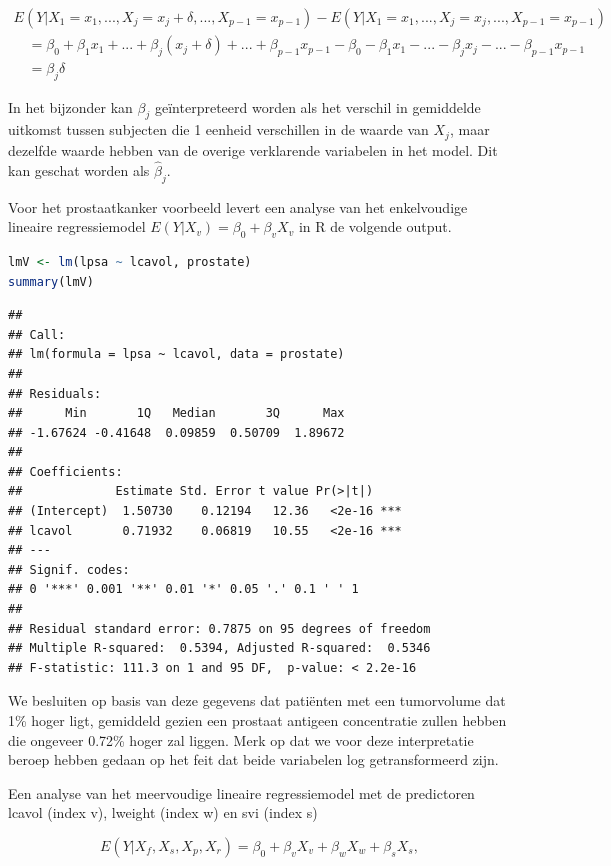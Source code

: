 \documentclass[
  12pt,dutch,coursenotes]{book}
\begin{document}
\[
\begin{array}{l}
E(Y|X_1=x_1,...,X_j=x_j+\delta,...,X_{p-1}=x_{p-1}) - E(Y|X_1=x_1,...,X_j=x_j,...,X_{p-1}=x_{p-1}) \\
\quad =\beta_0 + \beta_1 x_1 + ... + \beta_j(x_j+\delta)+...+\beta_{p-1} x_{p-1} - \beta_0 - \beta_1 x_1 - ... - \beta_jx_j-...-\beta_{p-1} x_{p-1} \\
\quad= \beta_j\delta
\end{array}
\]

In het bijzonder kan \(\beta_j\) geïnterpreteerd worden als het verschil in gemiddelde uitkomst tussen subjecten die 1 eenheid verschillen in de
waarde van \(X_j\), maar dezelfde waarde hebben van de overige verklarende variabelen in het model. Dit kan geschat worden als \(\hat{\beta}_j\).

Voor het prostaatkanker voorbeeld levert een analyse van het enkelvoudige lineaire regressiemodel \(E(Y|X_v)=\beta_0+\beta_v X_v\) in R de volgende output.

\begin{lstlisting}[language=R]
lmV <- lm(lpsa ~ lcavol, prostate)
summary(lmV)
\end{lstlisting}

\begin{lstlisting}
## 
## Call:
## lm(formula = lpsa ~ lcavol, data = prostate)
## 
## Residuals:
##      Min       1Q   Median       3Q      Max 
## -1.67624 -0.41648  0.09859  0.50709  1.89672 
## 
## Coefficients:
##             Estimate Std. Error t value Pr(>|t|)    
## (Intercept)  1.50730    0.12194   12.36   <2e-16 ***
## lcavol       0.71932    0.06819   10.55   <2e-16 ***
## ---
## Signif. codes:  
## 0 '***' 0.001 '**' 0.01 '*' 0.05 '.' 0.1 ' ' 1
## 
## Residual standard error: 0.7875 on 95 degrees of freedom
## Multiple R-squared:  0.5394, Adjusted R-squared:  0.5346 
## F-statistic: 111.3 on 1 and 95 DF,  p-value: < 2.2e-16
\end{lstlisting}

We besluiten op basis van deze gegevens dat patiënten met een tumorvolume dat 1\% hoger ligt, gemiddeld gezien een prostaat antigeen concentratie zullen hebben die ongeveer 0.72\% hoger zal liggen. Merk op dat we voor deze interpretatie beroep hebben gedaan op het feit dat beide variabelen log getransformeerd zijn.

Een analyse van het meervoudige lineaire regressiemodel met de predictoren lcavol (index v), lweight (index w) en svi (index s)

\[
E(Y|X_f,X_s,X_p,X_r)=\beta_0 +\beta_v X_v+\beta_w X_w+\beta_s X_s,
\]
\end{document}
